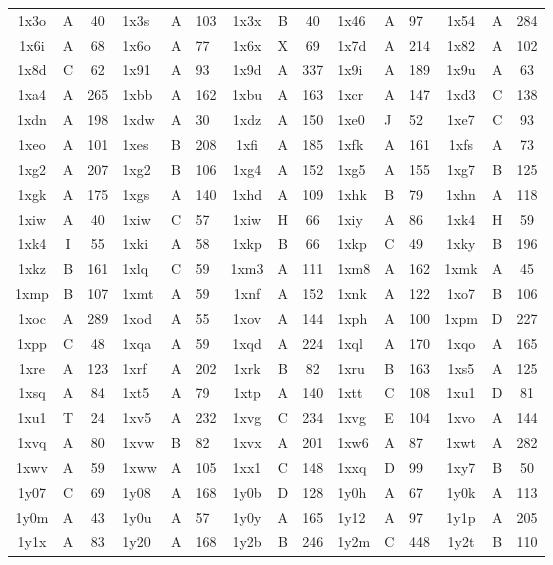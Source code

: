 \begin{longtable}{|c|c|c| a|a|a| c|c|c| a|a|a| c|c|c|}
1x3o & A & 40 & 1x3s & A & 103 & 1x3x & B & 40 & 1x46 & A & 97 & 1x54 & A & 284\\
1x6i & A & 68 & 1x6o & A & 77 & 1x6x & X & 69 & 1x7d & A & 214 & 1x82 & A & 102\\
1x8d & C & 62 & 1x91 & A & 93 & 1x9d & A & 337 & 1x9i & A & 189 & 1x9u & A & 63\\
1xa4 & A & 265 & 1xbb & A & 162 & 1xbu & A & 163 & 1xcr & A & 147 & 1xd3 & C & 138\\
1xdn & A & 198 & 1xdw & A & 30 & 1xdz & A & 150 & 1xe0 & J & 52 & 1xe7 & C & 93\\
1xeo & A & 101 & 1xes & B & 208 & 1xfi & A & 185 & 1xfk & A & 161 & 1xfs & A & 73\\
1xg2 & A & 207 & 1xg2 & B & 106 & 1xg4 & A & 152 & 1xg5 & A & 155 & 1xg7 & B & 125\\
1xgk & A & 175 & 1xgs & A & 140 & 1xhd & A & 109 & 1xhk & B & 79 & 1xhn & A & 118\\
1xiw & A & 40 & 1xiw & C & 57 & 1xiw & H & 66 & 1xiy & A & 86 & 1xk4 & H & 59\\
1xk4 & I & 55 & 1xki & A & 58 & 1xkp & B & 66 & 1xkp & C & 49 & 1xky & B & 196\\
1xkz & B & 161 & 1xlq & C & 59 & 1xm3 & A & 111 & 1xm8 & A & 162 & 1xmk & A & 45\\
1xmp & B & 107 & 1xmt & A & 59 & 1xnf & A & 152 & 1xnk & A & 122 & 1xo7 & B & 106\\
1xoc & A & 289 & 1xod & A & 55 & 1xov & A & 144 & 1xph & A & 100 & 1xpm & D & 227\\
1xpp & C & 48 & 1xqa & A & 59 & 1xqd & A & 224 & 1xql & A & 170 & 1xqo & A & 165\\
1xre & A & 123 & 1xrf & A & 202 & 1xrk & B & 82 & 1xru & B & 163 & 1xs5 & A & 125\\
1xsq & A & 84 & 1xt5 & A & 79 & 1xtp & A & 140 & 1xtt & C & 108 & 1xu1 & D & 81\\
1xu1 & T & 24 & 1xv5 & A & 232 & 1xvg & C & 234 & 1xvg & E & 104 & 1xvo & A & 144\\
1xvq & A & 80 & 1xvw & B & 82 & 1xvx & A & 201 & 1xw6 & A & 87 & 1xwt & A & 282\\
1xwv & A & 59 & 1xww & A & 105 & 1xx1 & C & 148 & 1xxq & D & 99 & 1xy7 & B & 50\\
1y07 & C & 69 & 1y08 & A & 168 & 1y0b & D & 128 & 1y0h & A & 67 & 1y0k & A & 113\\
1y0m & A & 43 & 1y0u & A & 57 & 1y0y & A & 165 & 1y12 & A & 97 & 1y1p & A & 205\\
1y1x & A & 83 & 1y20 & A & 168 & 1y2b & B & 246 & 1y2m & C & 448 & 1y2t & B & 110\\

\end{longtable}
